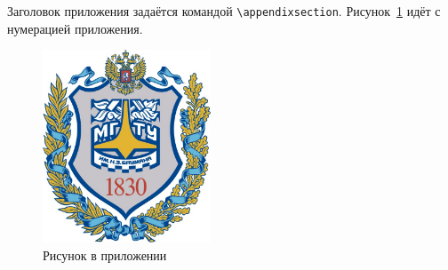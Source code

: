     

Заголовок приложения задаётся командой \texttt{\textbackslash appendixsection}. 
Рисунок~\ref{fig:a1} идёт с нумерацией приложения.

\begin{figure}
    \centering
    \includegraphics[width=5cm]{inc/bmstu}
    \caption{Рисунок в приложении}
    \label{fig:a1}
\end{figure}

\lipsum[1-2]
